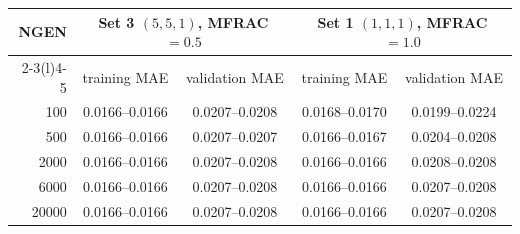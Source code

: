 \begin{tabular}{@{}r c c c c@{}}
\toprule
NGEN & \multicolumn{2}{c}{Set 3 $(5,5,1)$, MFRAC $=0.5$} & \multicolumn{2}{c}{Set 1 $(1,1,1)$, MFRAC $=1.0$}\\
\cmidrule(lr){2-3}\cmidrule(l){4-5}
 & training MAE & validation MAE & training MAE & validation MAE\\
\midrule
100 & 0.0166--0.0166 & 0.0207--0.0208 & 0.0168--0.0170 & 0.0199--0.0224\\
500 & 0.0166--0.0166 & 0.0207--0.0207 & 0.0166--0.0167 & 0.0204--0.0208\\
2000 & 0.0166--0.0166 & 0.0207--0.0208 & 0.0166--0.0166 & 0.0208--0.0208\\
6000 & 0.0166--0.0166 & 0.0207--0.0208 & 0.0166--0.0166 & 0.0207--0.0208\\
20000 & 0.0166--0.0166 & 0.0207--0.0208 & 0.0166--0.0166 & 0.0207--0.0208\\
\bottomrule
\end{tabular}
